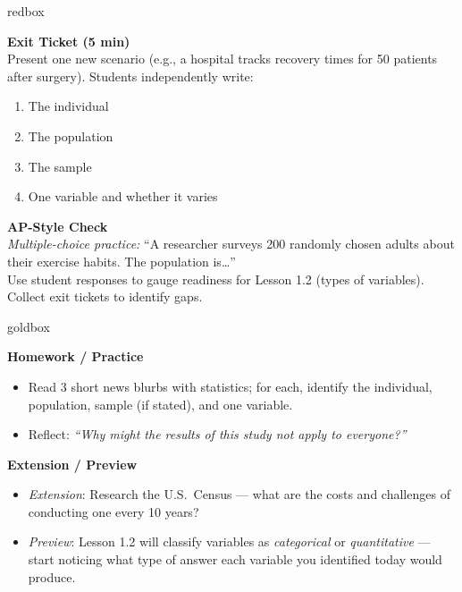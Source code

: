 \documentclass[10pt]{article}
\begin{document}
\begin{skillbox}{redbox}
\begin{minipage}[t]{0.48\linewidth}
    \textbf{Exit Ticket (5 min)}\\
    Present one new scenario (e.g., a hospital tracks recovery times for 50 patients after surgery). Students independently write:
    \begin{enumerate}
        \item The individual
        \item The population
        \item The sample
        \item One variable and whether it varies
    \end{enumerate}
\end{minipage}
\hfill
\begin{minipage}[t]{0.48\linewidth}
    \textbf{AP-Style Check}\\
    \textit{Multiple-choice practice:} ``A researcher surveys 200 randomly chosen adults about their exercise habits. The population is\ldots'' \\[4pt]
    Use student responses to gauge readiness for Lesson 1.2 (types of variables). Collect exit tickets to identify gaps.
\end{minipage}
\end{skillbox}

\begin{skillbox}{goldbox}
\begin{minipage}[t]{0.48\linewidth}
    \textbf{Homework / Practice}
    \begin{itemize}
        \item Read 3 short news blurbs with statistics; for each, identify the individual, population, sample (if stated), and one variable.
        \item Reflect: \textit{``Why might the results of this study not apply to everyone?''}
    \end{itemize}
\end{minipage}
\hfill
\begin{minipage}[t]{0.48\linewidth}
    \textbf{Extension / Preview}
    \begin{itemize}
        \item \textit{Extension}: Research the U.S.\ Census --- what are the costs and challenges of conducting one every 10 years?
        \item \textit{Preview}: Lesson 1.2 will classify variables as \textit{categorical} or \textit{quantitative} --- start noticing what type of answer each variable you identified today would produce.
    \end{itemize}
\end{minipage}
\end{skillbox}
\end{document}
